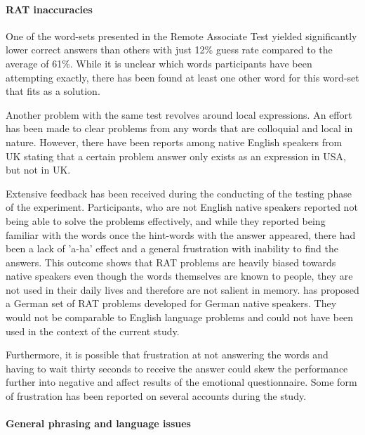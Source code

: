 	\paragraph{RAT inaccuracies}
	
	One of the word-sets presented in the Remote Associate Test yielded significantly lower correct answers than others with just 12\% guess rate compared to the average of 61\%. While it is unclear which words participants have been attempting exactly, there has been found at least one other word for this word-set that fits as a solution.
	
	Another problem with the same test revolves around local expressions. An effort has been made to clear problems from any words that are colloquial and local in nature. However, there have been reports among native English speakers from UK stating that a certain problem answer only exists as an expression in USA, but not in UK.	%
	
	Extensive feedback has been received during the conducting of the testing phase of the experiment. Participants, who are not English native speakers reported not being able to solve the problems effectively, and while they reported being familiar with the words once the hint-words with the answer appeared, there had been a lack of 'a-ha' effect and a general frustration with inability to find the answers. This outcome shows that RAT problems are heavily biased towards native speakers even though the words themselves are known to people, they are not used in their daily lives and therefore are not salient in memory. \cite{Landmann2014} has proposed a German set of RAT problems developed for German native speakers. They would not be comparable to English language problems and could not have been used in the context of the current study.
	
	Furthermore, it is possible that frustration at not answering the words and having to wait thirty seconds to receive the answer could skew the performance further into negative and affect results of the emotional questionnaire. Some form of frustration has been reported on several accounts during the study.
	

	\paragraph{General phrasing and language issues}
	
